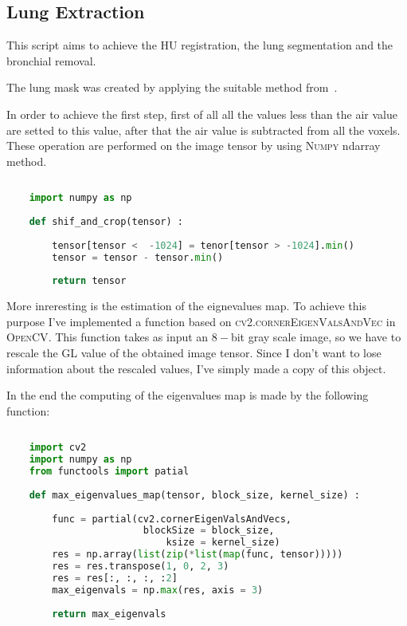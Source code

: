 \documentclass{standalone}
\begin{document}
	\subsection{Lung Extraction}
	
	This script aims to achieve the HU registration, the lung segmentation and the bronchial removal. 
	
	The lung mask was created by applying the suitable method from~\cite{REP:lungmask}. 

	In order to achieve the first step, first of all all the values less than the air value are setted to this value, after that the air value is subtracted from all the voxels. These operation are performed on the image tensor by using \textsc{Numpy} ndarray method.  
	
	\lstset{style=python}
	\begin{lstlisting}[language=python, caption=HU registering function, label=code:saf]
		
	import numpy as np
		
	def shif_and_crop(tensor) :
		
		tensor[tensor <  -1024] = tenor[tensor > -1024].min()
		tensor = tensor - tensor.min()
	
		return tensor
	\end{lstlisting}

	More inreresting is the estimation of the eignevalues map. To achieve this purpose I've implemented a function based on \textsc{cv2.cornerEigenValsAndVec} in \textsc{OpenCV}. This function takes as input an $8-$bit gray scale image, so we have to rescale the GL value of the obtained image tensor. Since I don't want to lose information about the rescaled values, I've simply made a copy of this object. 
	
	In the end the computing of the eigenvalues map is made by the following function: 
		\lstset{style=python}
	\begin{lstlisting}[language=python, caption=HU registering function, label=code:saf]
		
	import cv2
	import numpy as np
	from functools import patial
		
	def max_eigenvalues_map(tensor, block_size, kernel_size) :
		
		func = partial(cv2.cornerEigenValsAndVecs, 
						blockSize = block_size, 
							ksize = kernel_size)
		res = np.array(list(zip(*list(map(func, tensor)))))
		res = res.transpose(1, 0, 2, 3)
		res = res[:, :, :, :2]
		max_eigenvals = np.max(res, axis = 3)
	
		return max_eigenvals

	\end{lstlisting}
\end{document}
